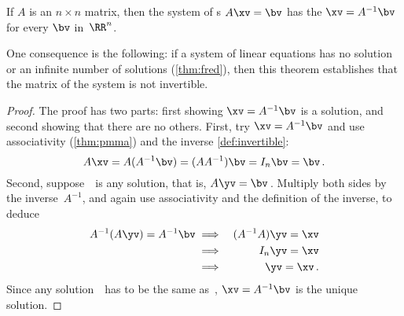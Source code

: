 \begin{theorem} \label{thm:invuniqsol} 
If \(A\) is an  \(n\times n\) matrix, then the system of s \(A\xv=\bv\) has the  \(\xv=A^{-1}\bv\) for every \(\bv\) in~\(\RR^n\).
\end{theorem}

One consequence is the following: if a system of linear equations has no solution or an infinite number of solutions (\autoref{thm:fred}), then this theorem establishes that the matrix of the system is not invertible.

\begin{proof} 
The proof has two parts: first showing \(\xv=A^{-1}\bv\) is a solution, and second showing that there are no others.
First,  try \(\xv=A^{-1}\bv\) and use associativity (\autoref{thm:pmma}) and the inverse \autoref{def:invertible}:
\begin{equation*}
A\xv=A(A^{-1}\bv)=(AA^{-1})\bv=I_n\bv=\bv\,.
\end{equation*}
Second, suppose~\yv\ is any solution, that is, \(A\yv=\bv\)\,.
Multiply both sides by the inverse~\(A^{-1}\), and again use associativity and the definition of the inverse, to deduce
\begin{eqnarray*}
A^{-1}(A\yv)=A^{-1}\bv
&\implies& (A^{-1}A)\yv=\xv
\\&\implies& I_n\yv=\xv
\\&\implies& \yv=\xv\,.
\end{eqnarray*}
Since any solution~\yv\ has to be the same as~\xv, \(\xv=A^{-1}\bv\) is the unique solution.
\end{proof}





